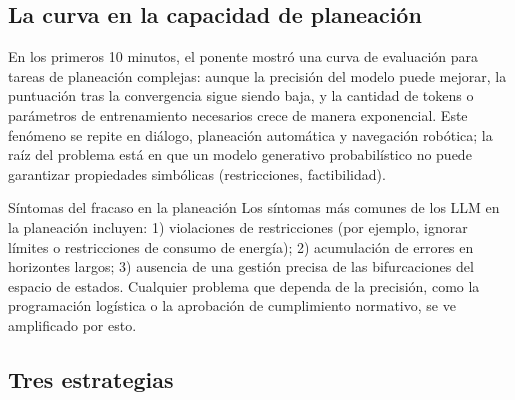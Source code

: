 \documentclass[a4paper]{article}
\begin{document}
\subsection{La curva en la capacidad de planeación}

En los primeros 10 minutos, el ponente mostró una curva de evaluación para tareas de planeación complejas: aunque la precisión del modelo puede mejorar, la puntuación tras la convergencia sigue siendo baja, y la cantidad de tokens o parámetros de entrenamiento necesarios crece de manera exponencial.
Este fenómeno se repite en diálogo, planeación automática y navegación robótica; la raíz del problema está en que un modelo generativo probabilístico no puede garantizar propiedades simbólicas (restricciones, factibilidad).
\begin{knowledgebox}{Síntomas del fracaso en la planeación}
Los síntomas más comunes de los LLM en la planeación incluyen: 1) violaciones de restricciones (por ejemplo, ignorar límites o restricciones de consumo de energía); 2) acumulación de errores en horizontes largos; 3) ausencia de una gestión precisa de las bifurcaciones del espacio de estados. Cualquier problema que dependa de la precisión, como la programación logística o la aprobación de cumplimiento normativo, se ve amplificado por esto.
\end{knowledgebox}

\subsection{Tres estrategias}
\end{document}
